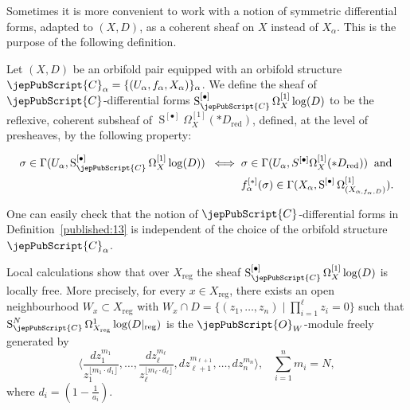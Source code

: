 Sometimes it is more convenient to work with a notion of symmetric differential forms, 
adapted to $(X,D)$, as a coherent sheaf on $X$ instead of $X_{\alpha}$. 
This is the purpose of the following definition. 

\begin{definition}
\label{published:13}
Let $(X,D)$ be an orbifold pair equipped with an orbifold structure 
$\jepPubScript{C}_{\alpha} = \{ (U_{\alpha}, f_{\alpha}, X_{\alpha})  \}_{\alpha}$.
We define the sheaf of $\jepPubScript{C}$-differential forms $\operatorname{S}^{[\bullet]}_{\jepPubScript{C}} \Omega^{[1]}_X\log (D)$
to be the reflexive, coherent subsheaf of $\operatorname{S}^{[\bullet]} \Omega^{[1]}_X(*D_{\operatorname{red}})$, defined, at the level of 
presheaves, by the following property: 

\[\begin{aligned}
\sigma \in \Gamma (U_{\alpha}, \operatorname{S}^{[\bullet]}_{\jepPubScript{C}} \Omega^{[1]}_X\log (D)) \; \; \Longleftrightarrow \;\; &
   \sigma \in \Gamma(U_{\alpha}, S^{[\bullet]} \Omega^{[1]}_X(* D_{\operatorname{red}}) ) \; \; \text{and} \\
    & f^{[*]}_{\alpha}(\sigma) \in \Gamma (X_{\alpha}, \operatorname{S}^{[\bullet]} \Omega^{[1]}_{(X_{\alpha, f_{\alpha}, D})} ).
\end{aligned}\]

\end{definition}

\begin{remark}
One can easily check that the notion of $\jepPubScript{C}$-differential forms in Definition~\ref{published:13}
is independent of the choice of the orbifold structure $\jepPubScript{C}_{\alpha}$.
\end{remark}

\begin{remark}
Local calculations show that over $X_{\operatorname{reg}}$ the sheaf $\operatorname{S}_{\jepPubScript{C}}^{[\bullet]}\Omega^{[1]}_{X}\log(D)$ 
is locally free. More precisely, for every $x\in X_{\operatorname{reg}}$, there
exists an open neighbourhood $W_x\subset X_{\operatorname{reg}}$ with $W_x\cap D = \{ (z_1, \ldots, z_n) \; \big| \; \prod_{i=1}^\ell z_i =0  \}$ 
such that $\operatorname{S}^N_{\jepPubScript{C}}\Omega^1_{X_{\operatorname{reg}}}\log (D|_{\operatorname{reg}})$ is the $\jepPubScript{O}_W$-module 
freely generated by 
$$
\langle \frac{dz_1^{m_1}}{z_1^{\lfloor m_1\cdot d_1 \rfloor}}, \ldots, \frac{dz_\ell^{m_\ell}}{z_\ell^{\lfloor m_\ell\cdot d_\ell \rfloor}},
     dz_{\ell+1}^{m_{\ell+1}}, \ldots, dz_n^{m_n}  \rangle, \;  \; \; \sum_{i=1}^n m_i = N,
$$
where $d_i= (1-\frac{1}{a_i})$.
\end{remark}


